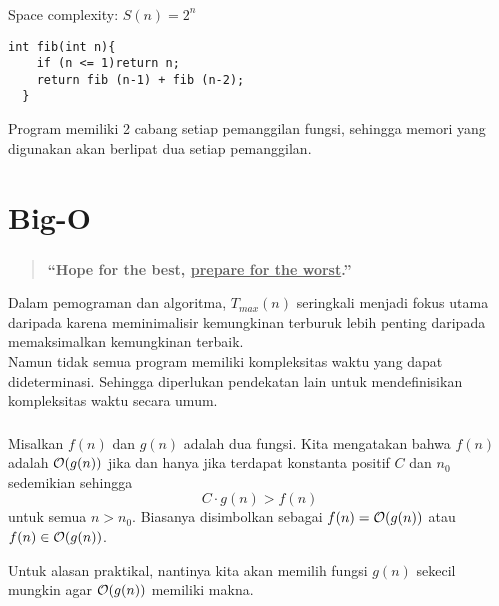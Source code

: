 \documentclass{../praktikum-ppt}
\begin{document}
\begin{frame}[fragile]
  \frametitle{\insertsection}
  \framesubtitle{\insertsubsection}
  \begin{contoh}
    Space complexity: $S(n)=2^n$
  \end{contoh}
  \begin{lstlisting}[caption={Fibonacci},captionpos=b]
  int fib(int n){
    if (n <= 1)return n;
    return fib (n-1) + fib (n-2);
  }
  \end{lstlisting}
  Program memiliki 2 cabang setiap pemanggilan fungsi, sehingga memori yang digunakan akan berlipat dua setiap pemanggilan.
\end{frame}


\section{Big-O}
\begin{frame}
  \frametitle{\insertsection}
  \begin{quote}
    \centering
    \textbf{``Hope for the best, \underline{prepare for the worst}.''}
  \end{quote}
  \begin{masalah}
    Dalam pemograman dan algoritma, $T_{max}(n)$ seringkali menjadi fokus utama daripada karena meminimalisir kemungkinan terburuk lebih penting daripada memaksimalkan kemungkinan terbaik.\\

    Namun tidak semua program memiliki kompleksitas waktu yang dapat dideterminasi. Sehingga diperlukan pendekatan lain untuk mendefinisikan kompleksitas waktu secara umum.
  \end{masalah}
\end{frame}

\begin{frame}
  \frametitle{\insertsection}
  \begin{definisi}[Big-O]
    Misalkan $f(n)$ dan $g(n)$ adalah dua fungsi. Kita mengatakan bahwa $f(n)$ adalah $\mathcal{O}(g(n))$ jika dan hanya jika terdapat konstanta positif $C$ dan $n_0$ sedemikian sehingga
\[
C \cdot g(n) > f(n)
\]
untuk semua $n > n_0$. Biasanya disimbolkan sebagai $f(n) = \mathcal{O}(g(n))$ atau $f(n) \in \mathcal{O}(g(n))$.
  \end{definisi}
  Untuk alasan praktikal, nantinya kita akan memilih fungsi $g(n)$ sekecil mungkin agar $\mathcal{O}(g(n))$ memiliki makna.
\end{frame}
\end{document}
